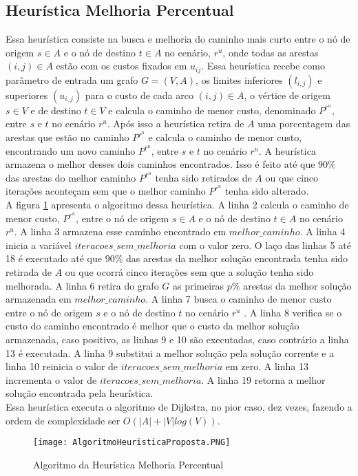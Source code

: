 \subsection{Heurística Melhoria Percentual}\label{sec:heuristicaProposta}
Essa heurística consiste na busca e melhoria do caminho mais curto entre o nó de origem $s \in A$ e o nó de destino $t \in A$ no cenário, $r^u$, 
onde todas as arestas $(i,j) \in A$ estão com os custos fixados em $u_{ij}$. Essa heurística recebe como parâmetro de entrada um grafo $G=(V,A)$,
os limites inferiores $(l_{i,j})$ e superiores $(u_{i,j})$ para o custo de cada arco $(i,j) \in A$, o vértice de
origem $s \in V$ e de destino $t \in V$ e calcula o caminho de menor custo, denominado $P^{r^u}$, entre $s$ e $t$ no cenário $r^u$. 
Após isso a heurística retira de $A$ uma porcentagem das arestas que estão no caminho $P^{r^u}$ e calcula o caminho de menor custo, encontrando 
um novo caminho $P^{r^u}$, entre $s$ e $t$ no cenário $r^u$. 
A heurística armazena o melhor desses dois caminhos encontrados. Isso é feito até que $90\%$ das arestas do melhor caminho $P^{r^u}$ tenha sido 
retirados de $A$ ou que cinco iterações aconteçam sem que o melhor caminho $P^{r^u}$ tenha sido alterado. \\
A figura \ref{f_HeuristicaProposta} apresenta o algoritmo dessa heurística. A linha 2 calcula o caminho de menor custo, $P^{r^u}$, entre 
o nó de origem $s \in A$ e o nó de destino $t \in A$ no cenário $r^u$. A linha 3 armazena esse caminho encontrado em $melhor\_caminho$. A 
linha 4 inicia a variável $iteracoes\_sem\_melhoria$ com o valor zero. O laço das linhas 5 até 18 é executado até 
que $90\%$ das arestas da melhor solução encontrada tenha sido retirada de $A$ ou que ocorrá
cinco iterações sem que a solução tenha sido melhorada. A linha 6 retira do grafo $G$ as primeiras $p\%$ arestas da melhor solução armazenada em 
$melhor\_caminho$. A linha 7 busca o caminho de menor custo entre o nó de origem $s$ e o nó de destino $t$ no cenário $r^u$ . A linha 8 
verifica se o custo do caminho encontrado é melhor que o custo da melhor solução armazenada, caso positivo, as linhas 9 e 10 são executadas, caso 
contrário a linha 13 é executada. A linha 9 substitui a melhor solução pela solução corrente e a linha 10 reinicia o valor de $iteracoes\_sem\_melhoria$ 
em zero. A linha 13 incrementa o valor de $iteracoes\_sem\_melhoria$.
A linha 19 retorna a melhor solução encontrada pela heurística. \\
Essa heurística executa o algoritmo de Dijkstra, no pior caso, dez vezes, fazendo a ordem de complexidade ser $O(|A| + |V|log(V))$.

\begin{figure}
\centering
\texttt{[image: AlgoritmoHeuristicaProposta.PNG]}
\caption{Algoritmo da Heurística Melhoria Percentual}
\label{f_HeuristicaProposta}
\end{figure}